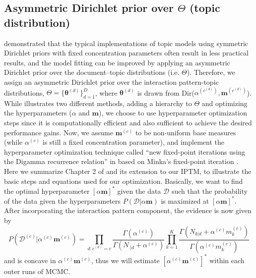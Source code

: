 \documentclass[a4paper]{article}
\begin{document}
 \subsection{Asymmetric Dirichlet prior over $\Theta$ (topic distribution)}
 \cite{wallach2009rethinking} demonstrated that the typical implementations of topic models using symmetric Dirichlet priors with fixed concentration parameters often result in less practical results, and the model fitting can be improved by applying an asymmetric Dirichlet prior over the document–topic distributions (i.e. $\Theta$). Therefore, we assign an asymmetric Dirichlet prior over the interaction pattern-topic distributions, $\Theta=\{\boldsymbol{\theta}^{(d)} \}_{d=1}^{D}$, where $\boldsymbol{\theta}^{(d)}$ is drawn from Dir($\alpha^{(c^{(d)})}, \boldsymbol{m}^{(c^{(d)})}$). While \cite{wallach2009rethinking} illustrates two different methods, adding a hierarchy to $\Theta$ and optimizing the hyperparameters ($\alpha$ and $\boldsymbol{m}$), we choose to use hyperparameter
 optimization steps since it is computationally efficient and also sufficient to achieve the desired performance gains. Now, we assume $\boldsymbol{m}^{(c)}$ to be non-uniform base measures (while $\alpha^{(c)}$ is still a fixed concentration parameter), and implement the hyperparameter optimization technique called ``new fixed-point iterations using the Digamma recurrence relation'' in \cite{wallach2008structured} based on Minka’s fixed-point iteration \citep{minka2000estimating}.\\ \newline
 Here we summarize Chapter 2 of \cite{wallach2008structured} and its extension to our IPTM, to illustrate the basic steps and equations used for our optimization. Basically, we want to find the optimal hyperparameter $[\alpha\boldsymbol{m}]^*$ given the data $\mathcal{D}$ such that the probability of the
 data given the hyperparameters $P(\mathcal{D}|\alpha\boldsymbol{m})$ is maximized at $[\alpha\boldsymbol{m}]^*$. After incorporating the interaction pattern component, the evidence is now given by 
 \begin{equation}
 P(\mathcal{D}^{(c)}|\alpha^{(c)}\boldsymbol{m}^{(c)})=\prod_{d:c^{(d)}=c} \frac{\Gamma(\alpha^{(c)})}{\Gamma(N_{\cdot|d}+\alpha^{(c)})}\prod_{k=1}^{K}\frac{\Gamma(N_{k|d}+\alpha^{(c)} m^{(c)}_k)}{\Gamma(\alpha^{(c)} m^{(c)}_k)}
 \end{equation} and is concave in $\alpha^{(c)} \boldsymbol{m}^{(c)}$, thus we will estimate $[\alpha^{(c)}\boldsymbol{m}^{(c)}]^*$ within each outer runs of MCMC.\\
\end{document}
